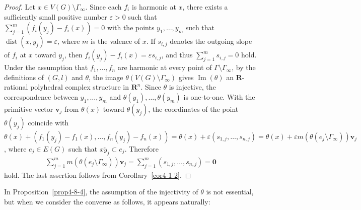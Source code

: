 \documentclass[a4paper,12pt]{amsart}
\def\Gamma{\varGamma}
\begin{document}
\begin{proof}
Let $x \in V(G) \setminus \Gamma_{\infty}$.
Since each $f_i$ is harmonic at $x$, there exists a sufficiently small positive number $\varepsilon > 0$ such that $\sum_{j = 1}^m (f_i(y_j) - f_i(x)) = 0$ with the points $y_1, \ldots, y_m$ such that $\operatorname{dist}(x, y_j) = \varepsilon$, where $m$ is the valence of $x$.
If $s_{i, j}$ denotes the outgoing slope of $f_i$ at $x$ toward $y_j$, then $f_i(y_j) - f_i(x) = \varepsilon s_{i, j}$, and thus $\sum_{j = 1}^m s_{i, j} = 0$ hold.
Under the assumption that $f_1, \ldots, f_n$ are harmonic at every point of $\Gamma \setminus \Gamma_{\infty}$, by the definitions of $(G, l)$ and $\theta$, the image $\theta(V(G) \setminus \Gamma_{\infty})$ gives $\operatorname{Im}(\theta)$ an $\boldsymbol{R}$-rational polyhedral complex structure in $\boldsymbol{R}^n$.
Since $\theta$ is injective, the correspondence between $y_1, \ldots, y_m$ and $\theta(y_1), \ldots, \theta(y_m)$ is one-to-one.
With the primitive vector $\boldsymbol{v}_j$ from $\theta(x)$ toward $\theta(y_j)$, the coordinates of the point $\theta(y_j)$ coincide with $\theta(x) + (f_1(y_j) - f_1(x), \ldots, f_n(y_j) - f_n(x)) = \theta(x) + \varepsilon (s_{1, j}, \ldots, s_{n, j}) = \theta(x) + \varepsilon m(\theta(e_j \setminus \Gamma_{\infty})) \boldsymbol{v}_j$, where $e_j \in E(G)$ such that $\overline{xy_j} \subset e_j$.
Therefore
\begin{align*}
\sum_{j = 1}^m m(\theta(e_j \setminus \Gamma_{\infty})) \boldsymbol{v}_j = \sum_{j = 1}^m  (s_{1, j}, \ldots, s_{n, j} ) = \boldsymbol{0 }
\end{align*}
hold.
The last assertion follows from Corollary~\ref{cor4-1-2}.
\end{proof}

In Proposition~\ref{prop4-8-4}, the assumption of the injectivity of $\theta$ is not essential, but when we consider the converse as follows, it appears naturally:
\end{document}
